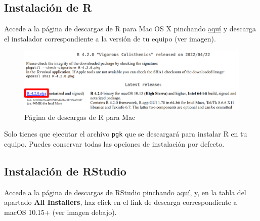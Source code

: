 \documentclass[
  title=normal,
  notoc,
  bib=normal]{mnye}
\newcommand{\passthrough}[1]{#1}
\begin{document}
\hypertarget{instalaciuxf3n-de-r-2}{%
\subsection{Instalación de R}\label{instalaciuxf3n-de-r-2}}

Accede a la página de descargas de \textsf{R} para Mac OS X pinchando \href{https://cloud.r-project.org/bin/macosx/}{aquí} y descarga el instalador correspondiente a la versión de tu equipo (ver imagen).

\begin{figure}

{\centering \includegraphics[width=1\linewidth]{images/r-mac} 

}

\caption{Página de descargas de R para Mac}\label{fig:unnamed-chunk-15}
\end{figure}

Solo tienes que ejecutar el archivo \passthrough{\lstinline!pgk!} que se descargará para instalar R en tu equipo. Puedes conservar todas las opciones de instalación por defecto.

\hypertarget{instalaciuxf3n-de-rstudio-2}{%
\subsection{Instalación de RStudio}\label{instalaciuxf3n-de-rstudio-2}}

Accede a la página de descargas de RStudio pinchando \href{https://rstudio.com/products/rstudio/download/\#download}{aquí}, y, en la tabla del apartado \textbf{All Installers}, haz click en el link de descarga correspondiente a macOS 10.15+ (ver imagen debajo).
\end{document}
